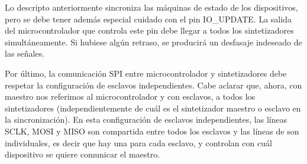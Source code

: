 \documentclass{article}
\newenvironment{standalone}{\begin{preview}}{\end{preview}}
\begin{document}
\begin{standalone}
  Lo descripto anteriormente sincroniza las máquinas de estado de los dispositivos, pero se debe tener además especial cuidado con el pin IO\_UPDATE.
  La salida del microcontrolador que controla este pin debe llegar a todos los sintetizadores simultáneamente.
  Si hubiese algún retraso, se producirá un desfasaje indeseado de las señales.

  Por último, la comunicación SPI entre microcontrolador y sintetizadores debe respetar la configuración de esclavos independientes.
  Cabe aclarar que, ahora, con maestro nos referimos al microcontrolador y con esclavos, a todos los sintetizadores (independientemente de cuál es el sintetizador maestro o esclavo en la sincronización).
  En esta configuración de esclavos independientes, las líneas SCLK, MOSI y MISO son compartida entre todos los esclavos y las líneas de  son individuales, es decir que hay una para cada esclavo, y controlan con cuál dispositivo se quiere comunicar el maestro.

\end{standalone}
\end{document}
